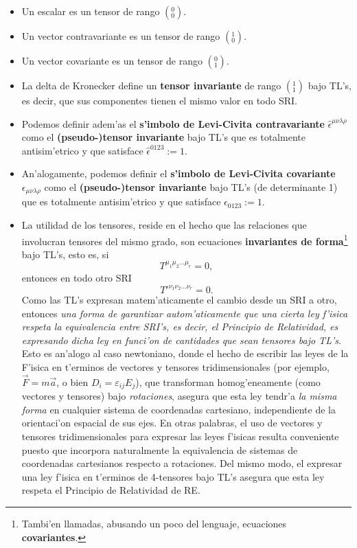 \begin{itemize}
\item Un escalar es un tensor de rango $(^0_0)$.
\item Un vector contravariante es un tensor de rango $(^1_0)$.
\item Un vector covariante es un tensor de rango $(^0_1)$.
\item La delta de Kronecker define un \textbf{tensor invariante} de rango $(^1_1)$ bajo TL's, es decir, que sus componentes tienen el mismo valor en todo SRI.
\item Podemos definir adem'as el \textbf{s'imbolo de Levi-Civita contravariante} $\hat\epsilon^{\mu\nu\lambda\rho}$ como el \textbf{(pseudo-)tensor invariante} bajo TL's que es totalmente antisim'etrico y que satisface $\hat\epsilon^{0123}:=1$.
\item An'alogamente, podemos definir el \textbf{s'imbolo de Levi-Civita
covariante} $\epsilon_{\mu\nu\lambda\rho}$ como el \textbf{(pseudo-)tensor invariante} bajo TL's (de determinante 1) que es totalmente antisim'etrico y
que satisface $\epsilon_{0123}:=1$.

\item La utilidad de los tensores, reside en el hecho que las relaciones que
involucran tensores del mismo grado, son ecuaciones 
\textbf{invariantes de forma}\footnote{Tambi'en llamadas, abusando un poco del lenguaje, ecuaciones \textbf{covariantes}.} bajo TL's, esto es, si
\begin{equation}
T^{\mu_1 \mu_2 ... \mu_r}=0,
\end{equation}
entonces en todo otro SRI 
\begin{equation}
T'^{\nu_1 \nu_2 ... \nu_r}=0.
\end{equation}
Como las TL's expresan matem'aticamente el cambio desde un SRI a otro, entonces \textit{una forma de garantizar autom'aticamente que una cierta ley f'isica respeta la equivalencia entre SRI's, es decir, el Principio de Relatividad, es expresando dicha ley en funci'on de cantidades que sean tensores bajo TL's}. Esto es an'alogo al caso newtoniano, donde el hecho de escribir las leyes de la F'isica en t'erminos de vectores y tensores tridimensionales (por ejemplo,
$\vec{F}=m\vec{a}$, o bien $D_i=\varepsilon_{ij}E_j$), que transforman homog'eneamente (como vectores y tensores) bajo \textit{rotaciones}, asegura que esta ley tendr'a \textit{la misma forma} en cualquier sistema de coordenadas cartesiano, independiente de la orientaci'on espacial de sus ejes. En otras palabras, el uso de vectores y tensores tridimensionales para expresar las leyes f'isicas resulta conveniente puesto que incorpora naturalmente la equivalencia de sistemas de coordenadas cartesianos respecto a rotaciones. Del mismo modo, el expresar una ley f'isica en t'erminos de 4-tensores bajo TL's asegura que esta ley respeta el Principio de Relatividad de RE.

\end{itemize}

